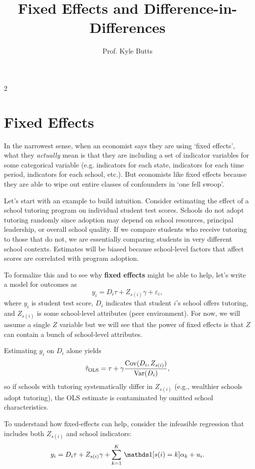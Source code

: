 \documentclass[12pt]{article}
\title{Fixed Effects and Difference-in-Differences}
\author{Prof. Kyle Butts}
\date{}
\begin{document}
\maketitle
\begin{multicols}{2}

\section*{Fixed Effects}

In the narrowest sense, when an economist says they are using `fixed effects', what they \emph{actually} mean is that they are including a set of indicator variables for some categorical variable (e.g. indicators for each state, indicators for each time period, indicators for each school, etc.).
But economists like fixed effects because they are able to wipe out entire classes of confounders in `one fell swoop'. 

Let's start with an example to build intuition.
Consider estimating the effect of a school tutoring program on individual student test scores.
Schools do not adopt tutoring randomly since adoption may depend on school resources, principal leadership, or overall school quality.
If we compare students who receive tutoring to those that do not, we are essentially comparing students in very different school contexts. 
Estimates will be biased because school-level factors that affect scores are correlated with program adoption.

To formalize this and to see why \textbf{fixed effects} might be able to help, let's write a model for outcomes as
$$
  y_i = D_i \tau + Z_{s(i)} \gamma + \varepsilon_i,
$$
where $y_i$ is student test score, $D_i$ indicates that student \(i\)'s school offers tutoring, and $Z_{s(i)}$ is some school-level attributes (peer environment). 
For now, we will assume a single $Z$ variable but we will see that the power of fixed effects is that $Z$ can contain a bunch of school-level attributes.

Estimating \(y_i\) on \(D_i\) alone yields
$$
  \hat{\tau}_{\text{OLS}} = \tau + \gamma\frac{\cov(D_i, Z_{s(i)})}{\var(D_i)},
$$
so if schools with tutoring systematically differ in $Z_{s(i)}$ (e.g., wealthier schools adopt tutoring), the OLS estimate is contaminated by omitted school characteristics.
% 

To understand how fixed-effects can help, consider the infeasible regression that includes both $Z_{s(i)}$ and school indicators:
$$
  y_i = D_i \tau + Z_{s(i)} \gamma + \sum_{k=1}^K \one{s(i)=k}\alpha_k + u_i.
$$


\end{multicols}
\end{document}
